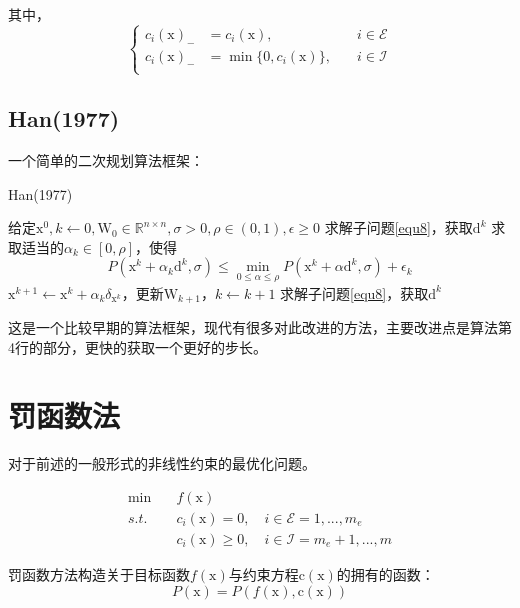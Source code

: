 \documentclass[a4paper]{D:/repositories/MyDGP/latex/PaperReadingLog}
\begin{document}
其中，
$$
\left\{
\begin{aligned}
    c_i(\mathrm{x})_-&=c_i(\mathrm{x}),\quad&i\in\mathcal{E}\\
    c_i(\mathrm{x})_-&=\min\{0,c_i(\mathrm{x})\},\quad&i\in\mathcal{I}\\
\end{aligned}    
\right.
$$

\subsection{Han(1977)}
一个简单的二次规划算法框架：
\begin{algorithm}[H]
	\caption{Han(1977)} 
	\begin{algorithmic}[1]
		\STATE 给定$\mathrm{x}^0,k\leftarrow 0,\mathrm{W}_0\in\mathbb{R}^{n\times n},\sigma>0,\rho\in(0,1),\epsilon\ge0$
        \STATE 求解子问题\ref{equ8}，获取$\mathrm{d}^k$
            \STATE 求取适当的$\alpha_k\in[0,\rho]$，使得$$
            P(\mathrm{x}^k+\alpha_k\mathrm{d}^k,\sigma)\le\min_{0\le\alpha\le\rho}P(\mathrm{x}^k+\alpha\mathrm{d}^k,\sigma)+\epsilon_k
            $$
            \STATE $\mathrm{x}^{k+1}\leftarrow\mathrm{x}^k+\alpha_k\delta_{\mathrm{x}^k}$，更新$\mathrm{W}_{k+1}$，$k\leftarrow k+1$
            \STATE 求解子问题\ref{equ8}，获取$\mathrm{d}^k$
        \ENDWHILE
	\end{algorithmic}
\end{algorithm}

这是一个比较早期的算法框架，现代有很多对此改进的方法，主要改进点是算法第4行的部分，更快的获取一个更好的步长。

\section{罚函数法}
对于前述的一般形式的非线性约束的最优化问题。

\begin{equation}
    \label{equ9}
    \begin{aligned}
        \min\quad& f(\mathrm{x})\\
        s.t.\quad& c_i(\mathrm{x})=0,\quad i\in\mathcal{E}={1,...,m_e}\\
                      & c_i(\mathrm{x})\ge 0,\quad i\in\mathcal{I}={m_e+1,...,m}
    \end{aligned}        
\end{equation}

罚函数方法构造关于目标函数$f(\mathrm{x})$与约束方程$\mathrm{c}(\mathrm{x})$的拥有的函数：
$$
P(\mathrm{x})=P(f(\mathrm{x}),\mathrm{c}(\mathrm{x}))
$$
\end{document}
